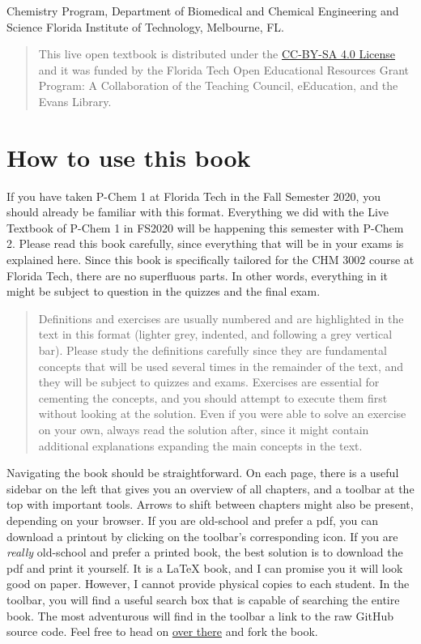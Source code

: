 \documentclass[
  9pt,
]{extbook}
\begin{document}
Chemistry Program, Department of Biomedical and Chemical Engineering and Science
Florida Institute of Technology, Melbourne, FL.

\begin{quote}
This live open textbook is distributed under the \href{https://creativecommons.org/licenses/by-sa/4.0/}{CC-BY-SA 4.0 License} and it was funded by the Florida Tech Open Educational Resources Grant Program: A Collaboration of the Teaching Council, eEducation, and the Evans Library.
\end{quote}

\hypertarget{how-to-use-this-book}{%
\section*{How to use this book}\label{how-to-use-this-book}}

If you have taken P-Chem 1 at Florida Tech in the Fall Semester 2020, you should already be familiar with this format. Everything we did with the Live Textbook of P-Chem 1 in FS2020 will be happening this semester with P-Chem 2. Please read this book carefully, since everything that will be in your exams is explained here.
Since this book is specifically tailored for the CHM 3002 course at Florida Tech, there are no superfluous parts. In other words, everything in it might be subject to question in the quizzes and the final exam.

\begin{quote}
Definitions and exercises are usually numbered and are highlighted in the text in this format (lighter grey, indented, and following a grey vertical bar). Please study the definitions carefully since they are fundamental concepts that will be used several times in the remainder of the text, and they will be subject to quizzes and exams. Exercises are essential for cementing the concepts, and you should attempt to execute them first without looking at the solution. Even if you were able to solve an exercise on your own, always read the solution after, since it might contain additional explanations expanding the main concepts in the text.
\end{quote}

Navigating the book should be straightforward. On each page, there is a useful sidebar on the left that gives you an overview of all chapters, and a toolbar at the top with important tools. Arrows to shift between chapters might also be present, depending on your browser. If you are old-school and prefer a pdf, you can download a printout by clicking on the toolbar's corresponding icon. If you are \emph{really} old-school and prefer a printed book, the best solution is to download the pdf and print it yourself. It is a LaTeX book, and I can promise you it will look good on paper. However, I cannot provide physical copies to each student. In the toolbar, you will find a useful search box that is capable of searching the entire book. The most adventurous will find in the toolbar a link to the raw GitHub source code. Feel free to head on \href{https://github.com/peverati/PChem2}{over there} and fork the book.
\end{document}
